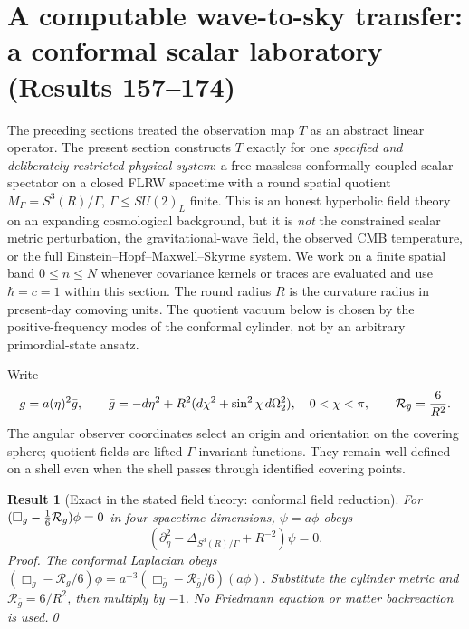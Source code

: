 \documentclass[aps,prd,onecolumn,notitlepage,groupedaddress,11pt]{revtex4-2}
\newtheorem{result}{Result}
\begin{document}
\section{A computable wave-to-sky transfer: a conformal scalar laboratory (Results 157--174)}\label{sec:explicit-transfer}
The preceding sections treated the observation map $T$ as an abstract linear operator. The present section constructs $T$ exactly for one \emph{specified and deliberately restricted physical system}: a free massless conformally coupled scalar spectator on a closed FLRW spacetime with a round spatial quotient $M_\Gamma=S^3(R)/\Gamma$, $\Gamma\le SU(2)_L$ finite. This is an honest hyperbolic field theory on an expanding cosmological background, but it is \emph{not} the constrained scalar metric perturbation, the gravitational-wave field, the observed CMB temperature, or the full Einstein--Hopf--Maxwell--Skyrme system. We work on a finite spatial band $0\le n\le N$ whenever covariance kernels or traces are evaluated and use $\hbar=c=1$ within this section. The round radius $R$ is the curvature radius in present-day comoving units. The quotient vacuum below is chosen by the positive-frequency modes of the conformal cylinder, not by an arbitrary primordial-state ansatz.

Write
\begin{equation}\label{eq:explicit-background}
 g=a(\eta)^2\bar g,\qquad \bar g=-d\eta^2+R^2(d\chi^2+\sin^2\chi\,d\Omega_2^2),\quad 0<\chi<\pi,
 \qquad {\cal R}_{\bar g}=\frac6{R^2}.
\end{equation}
The angular observer coordinates select an origin and orientation on the covering sphere; quotient fields are lifted $\Gamma$-invariant functions. They remain well defined on a shell even when the shell passes through identified covering points.

\begin{result}[\textsf{Exact in the stated field theory}: conformal field reduction]\label{new:157}
For $(\Box_g-\tfrac16{\cal R}_g)\phi=0$ in four spacetime dimensions, $\psi=a\phi$ obeys
\begin{equation}\label{new:eq157}
 (\partial_\eta^2-\Delta_{S^3(R)/\Gamma}+R^{-2})\psi=0.
\end{equation}
\textit{Proof.} The conformal Laplacian obeys $(\Box_g-\mathcal R_g/6)\phi=a^{-3}(\Box_{\bar g}-\mathcal R_{\bar g}/6)(a\phi)$. Substitute the cylinder metric and $\mathcal R_{\bar g}=6/R^2$, then multiply by $-1$. No Friedmann equation or matter backreaction is used.\qed
\end{result}
\end{document}
